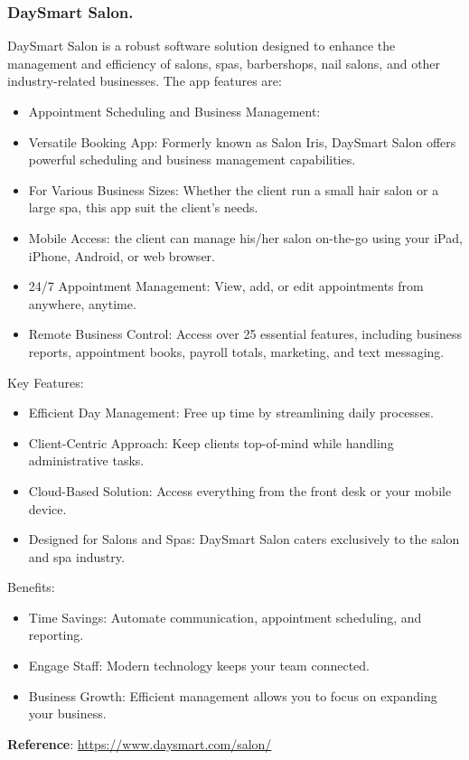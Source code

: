 \documentclass{article}
\begin{document}
      \subsubsection{DaySmart Salon.}
      DaySmart Salon is a robust software solution designed to enhance the management and efficiency of salons, spas, barbershops, nail salons, and other industry-related businesses. The app features are:
      \begin{itemize}
        \item Appointment Scheduling and Business Management:
        \item Versatile Booking App: Formerly known as Salon Iris, DaySmart Salon offers powerful scheduling and business management capabilities.
        \item For Various Business Sizes: Whether the client run a small hair salon or a large spa, this app suit the client’s needs.
        \item ­­­Mobile Access: the client can manage his/her salon on-the-go using your iPad, iPhone, Android, or web browser.
        \item 24/7 Appointment Management: View, add, or edit appointments from anywhere, anytime.
        \item Remote Business Control: Access over 25 essential features, including business reports, appointment books, payroll totals, marketing, and text messaging.  
      \end{itemize}
      Key Features:
    \begin{itemize}
        \item Efficient Day Management: Free up time by streamlining daily processes.
        \item Client-Centric Approach: Keep clients top-of-mind while handling administrative tasks.
        \item Cloud-Based Solution: Access everything from the front desk or your mobile device.
        \item Designed for Salons and Spas: DaySmart Salon caters exclusively to the salon and spa industry.
    \end{itemize}
      Benefits:
      \begin{itemize}
        \item Time Savings: Automate communication, appointment scheduling, and reporting.
        \item Engage Staff: Modern technology keeps your team connected.
        \item Business Growth: Efficient management allows you to focus on expanding your business.  
      \end{itemize}      
      \textbf{Reference}: \href{https://www.daysmart.com/salon/}{https://www.daysmart.com/salon/}
\end{document}
